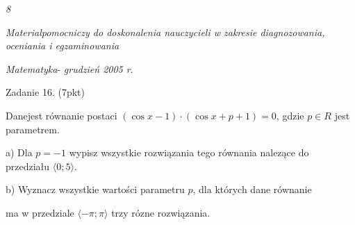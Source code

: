 \documentclass[a4paper,12pt]{article}
\begin{document}
{\it 8}

{\it Materialpomocniczy do doskonalenia nauczycieli w zakresie diagnozowania, oceniania i egzaminowania}

{\it Matematyka}- {\it grudzień 2005 r}.

Zadanie 16. (7pkt)

Danejest równanie postaci $(\cos x-1)\cdot(\cos x+p+1)=0$, gdzie $p\in R$ jest parametrem.

a) Dla $p=-1$ wypisz wszystkie rozwiązania tego równania nalezące do przedziału $\langle 0;5\rangle.$

b) Wyznacz wszystkie wartości parametru $p$, dla których dane równanie

ma w przedziale $\langle-\pi;\pi\rangle$ trzy rózne rozwiązania.
\end{document}
